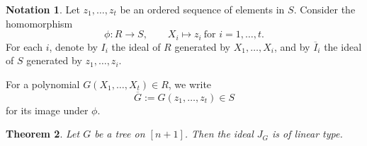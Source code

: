 \documentclass[11pt,a4paper,reqno]{amsart}
\newtheorem{theorem}{Theorem}[section]
\theoremstyle{definition}
\newtheorem{notation}[theorem]{Notation}
\begin{document}
\begin{notation}
Let \(z_1,\ldots,z_t\) be an ordered sequence of elements in \(S\). Consider the homomorphism
\[
\phi : R \longrightarrow S, \qquad X_i \mapsto z_i \ \text{for } i=1,\ldots,t.
\]
For each \(i\), denote by \(I_i\) the ideal of \(R\) generated by \(X_1,\ldots,X_i\), and by \(\overline{I}_i\) the ideal of \(S\) generated by \(z_1,\ldots,z_i\).

For a polynomial \(G(X_1,\ldots,X_t) \in R\), we write
\[
\overline{G} := G(z_1,\ldots,z_t) \in S
\]
for its image under \(\phi\).
\end{notation}


\begin{theorem} \label{thm.conj}
    Let $G$ be a tree on $[n+1]$. Then the ideal $J_G$ is of linear type. 
\end{theorem}
\end{document}
